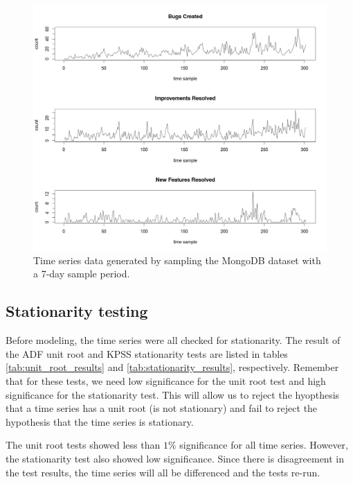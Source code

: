 \documentclass[a4paper]{scrartcl}
\begin{document}
\begin{figure}[htbp!]
\begin{center}
\includegraphics[width=\textwidth]{images/time_series}
\caption{Time series data generated by sampling the MongoDB dataset with a 7-day sample period.}
\label{fig:time_series}
\end{center}
\end{figure}

\subsection*{Stationarity testing}

Before modeling, the time series were all checked for stationarity. The result of the ADF unit root and KPSS stationarity tests are listed in tables \ref{tab:unit_root_results} and \ref{tab:stationarity_results}, respectively. Remember that for these tests, we need low significance for the unit root test and high significance for the stationarity test. This will allow us to reject the hyopthesis that a time series has a unit root (is not stationary) and fail to reject the hypothesis that the time series is stationary. 

The unit root tests showed less than $1\%$ significance for all time series. However, the stationarity test also showed low significance. Since there is disagreement in the test results, the time series will all be differenced and the tests re-run.
\end{document}
